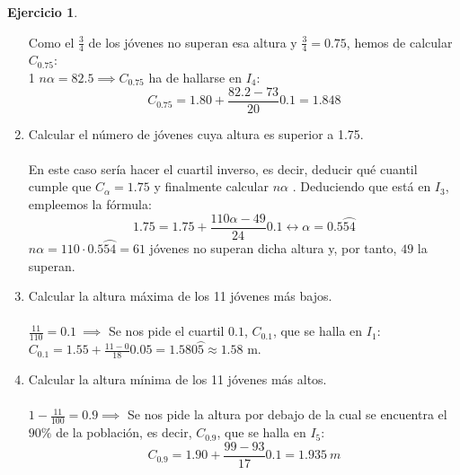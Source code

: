 \documentclass[a4paper, 12pt]{article}
\theoremstyle{definition}
\newtheorem{ej}{Ejercicio}
\begin{document}
\begin{ej}
\begin{enumerate}[label=\textit{\alph*)}]
    Como el $\frac{3}{4}$ de los jóvenes no superan esa altura y $\frac{3}{4}=0.75$, hemos de calcular $C_{0.75}$:
    \\
    1 $n\alpha = 82.5 \implies C_{0.75}$ ha de hallarse en $I_{4}$:
    $$C_{0.75} = 1.80 + \frac{82.2 - 73}{20}0.1 = 1.848$$
    \item Calcular el número de jóvenes cuya altura es superior a 1.75. \\\\
    En este caso sería hacer el cuartil inverso, es decir, deducir qué cuantil cumple que $C_{\alpha} = 1.75$ y finalmente calcular $n\alpha$ . Deduciendo que está en $I_{3}$, empleemos la fórmula:
    $$1.75 = 1.75 + \frac{110\alpha - 49}{24}0.1 \longleftrightarrow \alpha = 0.5\wideparen{54}$$
    $n\alpha = 110 \cdot 0.5\wideparen{54} = 61$ jóvenes no superan dicha altura y, por tanto, $49$ la superan. \\
    \item Calcular la altura máxima de los 11 jóvenes más bajos.\\\\
    $\frac{11}{110} = 0.1 \ \implies$ Se nos pide el cuartil $0.1$, $C_{0.1}$, que se halla en $I_{1}$: \\
    $C_{0.1} = 1.55 + \frac{11-0}{18}0.05 = 1.580\wideparen{5} \approx 1.58$ m. \\
    \item Calcular la altura mínima de los 11 jóvenes más altos.
    \\\\
    $1-\frac{11}{100}=0.9 \implies$ Se nos pide la altura por debajo de la cual se encuentra el $90\%$ de la población, es decir, $C_{0.9}$, que se halla en $I_{5}$: \\
    $$C_{0.9} = 1.90 + \frac{99-93}{17}0.1 = 1.935 \ m$$
\end{enumerate}
\end{ej}

\newpage
\end{document}
